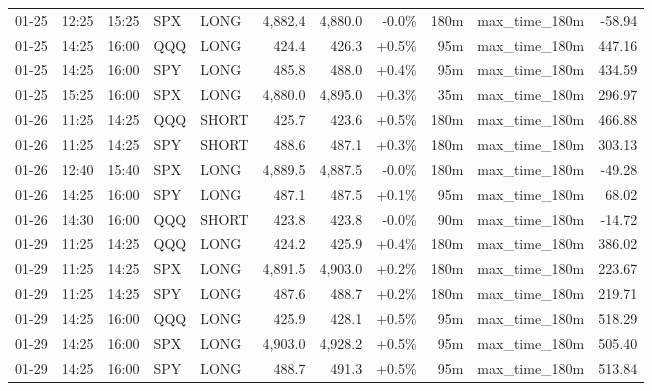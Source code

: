 \documentclass[11pt,a4paper,twoside]{article}
\begin{document}
\begin{center}
\begin{longtable}{>{\color{txtmain}}l l l l l r r r r >{\color{txtmain}}l r}
01-25 & 12:25 & 15:25 & SPX & LONG & 4,882.4 & 4,880.0 & \textcolor{lossred}{-0.0\%} & 180m & max\_time\_180m & \textcolor{lossred}{-58.94} \\
01-25 & 14:25 & 16:00 & QQQ & LONG & 424.4 & 426.3 & \textcolor{wingreen}{+0.5\%} & 95m & max\_time\_180m & \textcolor{wingreen}{447.16} \\
01-25 & 14:25 & 16:00 & SPY & LONG & 485.8 & 488.0 & \textcolor{wingreen}{+0.4\%} & 95m & max\_time\_180m & \textcolor{wingreen}{434.59} \\
01-25 & 15:25 & 16:00 & SPX & LONG & 4,880.0 & 4,895.0 & \textcolor{wingreen}{+0.3\%} & 35m & max\_time\_180m & \textcolor{wingreen}{296.97} \\
01-26 & 11:25 & 14:25 & QQQ & SHORT & 425.7 & 423.6 & \textcolor{wingreen}{+0.5\%} & 180m & max\_time\_180m & \textcolor{wingreen}{466.88} \\
01-26 & 11:25 & 14:25 & SPY & SHORT & 488.6 & 487.1 & \textcolor{wingreen}{+0.3\%} & 180m & max\_time\_180m & \textcolor{wingreen}{303.13} \\
01-26 & 12:40 & 15:40 & SPX & LONG & 4,889.5 & 4,887.5 & \textcolor{lossred}{-0.0\%} & 180m & max\_time\_180m & \textcolor{lossred}{-49.28} \\
01-26 & 14:25 & 16:00 & SPY & LONG & 487.1 & 487.5 & \textcolor{wingreen}{+0.1\%} & 95m & max\_time\_180m & \textcolor{wingreen}{68.02} \\
01-26 & 14:30 & 16:00 & QQQ & SHORT & 423.8 & 423.8 & \textcolor{lossred}{-0.0\%} & 90m & max\_time\_180m & \textcolor{lossred}{-14.72} \\
01-29 & 11:25 & 14:25 & QQQ & LONG & 424.2 & 425.9 & \textcolor{wingreen}{+0.4\%} & 180m & max\_time\_180m & \textcolor{wingreen}{386.02} \\
01-29 & 11:25 & 14:25 & SPX & LONG & 4,891.5 & 4,903.0 & \textcolor{wingreen}{+0.2\%} & 180m & max\_time\_180m & \textcolor{wingreen}{223.67} \\
01-29 & 11:25 & 14:25 & SPY & LONG & 487.6 & 488.7 & \textcolor{wingreen}{+0.2\%} & 180m & max\_time\_180m & \textcolor{wingreen}{219.71} \\
01-29 & 14:25 & 16:00 & QQQ & LONG & 425.9 & 428.1 & \textcolor{wingreen}{+0.5\%} & 95m & max\_time\_180m & \textcolor{wingreen}{518.29} \\
01-29 & 14:25 & 16:00 & SPX & LONG & 4,903.0 & 4,928.2 & \textcolor{wingreen}{+0.5\%} & 95m & max\_time\_180m & \textcolor{wingreen}{505.40} \\
01-29 & 14:25 & 16:00 & SPY & LONG & 488.7 & 491.3 & \textcolor{wingreen}{+0.5\%} & 95m & max\_time\_180m & \textcolor{wingreen}{513.84} \\

\end{longtable}
\end{center}
\end{document}
